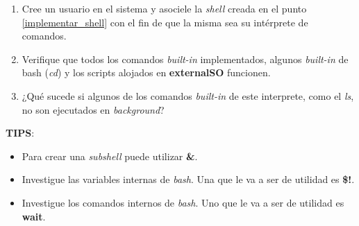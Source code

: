 \begin{enumerate}
      \item Cree un usuario en el sistema y asociele la \textit{shell} creada en el punto \ref{implementar_shell} con el fin de que la misma sea su intérprete de comandos.
      
      \item Verifique que todos los comandos \textit{built-in} implementados, algunos \textit{built-in} de bash (\textit{cd}) y los scripts alojados en \textbf{externalSO} funcionen.

      \item ¿Qué sucede si algunos de los comandos \textit{built-in} de este interprete, como el \textit{ls}, no son ejecutados en \textit{background}?

\end{enumerate}

\textbf{TIPS}:
\begin{itemize}
	\item Para crear una \textit{subshell} puede utilizar \textbf{\&}.
	\item Investigue las variables internas de \emph{bash}. Una que le va a ser de utilidad es \textbf{\$!}.
	\item Investigue los comandos internos de \emph{bash}. Uno que le va a ser de utilidad es \textbf{wait}.
\end{itemize}